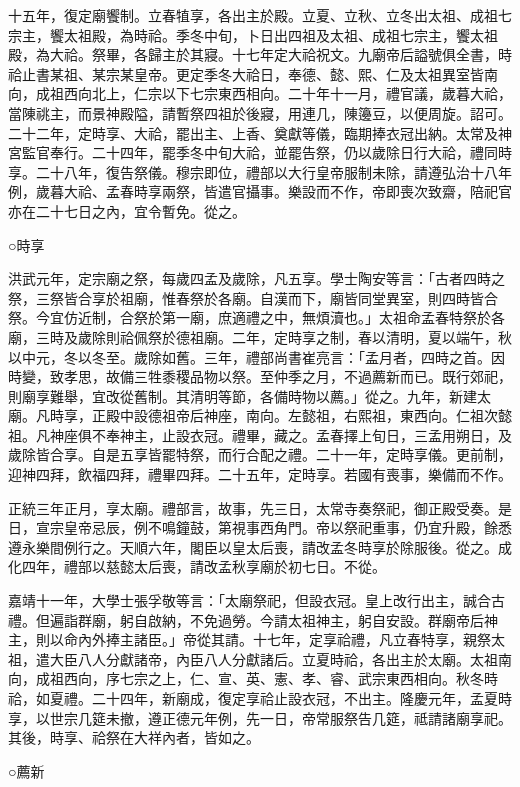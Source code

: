 十五年，復定廟饗制。立春犆享，各出主於殿。立夏、立秋、立冬出太祖、成祖七宗主，饗太祖殿，為時祫。季冬中旬，卜日出四祖及太祖、成祖七宗主，饗太祖殿，為大祫。祭畢，各歸主於其寢。十七年定大祫祝文。九廟帝后謚號俱全書，時祫止書某祖、某宗某皇帝。更定季冬大祫日，奉德、懿、熙、仁及太祖異室皆南向，成祖西向北上，仁宗以下七宗東西相向。二十年十一月，禮官議，歲暮大祫，當陳祧主，而景神殿隘，請暫祭四祖於後寢，用連几，陳籩豆，以便周旋。詔可。二十二年，定時享、大祫，罷出主、上香、奠獻等儀，臨期捧衣冠出納。太常及神宮監官奉行。二十四年，罷季冬中旬大祫，並罷告祭，仍以歲除日行大祫，禮同時享。二十八年，復告祭儀。穆宗即位，禮部以大行皇帝服制未除，請遵弘治十八年例，歲暮大祫、孟春時享兩祭，皆遣官攝事。樂設而不作，帝即喪次致齋，陪祀官亦在二十七日之內，宜令暫免。從之。

○時享

洪武元年，定宗廟之祭，每歲四孟及歲除，凡五享。學士陶安等言：「古者四時之祭，三祭皆合享於祖廟，惟春祭於各廟。自漢而下，廟皆同堂異室，則四時皆合祭。今宜仿近制，合祭於第一廟，庶適禮之中，無煩瀆也。」太祖命孟春特祭於各廟，三時及歲除則祫佩祭於德祖廟。二年，定時享之制，春以清明，夏以端午，秋以中元，冬以冬至。歲除如舊。三年，禮部尚書崔亮言：「孟月者，四時之首。因時變，致孝思，故備三牲黍稷品物以祭。至仲季之月，不過薦新而已。既行郊祀，則廟享難舉，宜改從舊制。其清明等節，各備時物以薦。」從之。九年，新建太廟。凡時享，正殿中設德祖帝后神座，南向。左懿祖，右熙祖，東西向。仁祖次懿祖。凡神座俱不奉神主，止設衣冠。禮畢，藏之。孟春擇上旬日，三孟用朔日，及歲除皆合享。自是五享皆罷特祭，而行合配之禮。二十一年，定時享儀。更前制，迎神四拜，飲福四拜，禮畢四拜。二十五年，定時享。若國有喪事，樂備而不作。

正統三年正月，享太廟。禮部言，故事，先三日，太常寺奏祭祀，御正殿受奏。是日，宣宗皇帝忌辰，例不鳴鐘鼓，第視事西角門。帝以祭祀重事，仍宜升殿，餘悉遵永樂間例行之。天順六年，閣臣以皇太后喪，請改孟冬時享於除服後。從之。成化四年，禮部以慈懿太后喪，請改孟秋享廟於初七日。不從。

嘉靖十一年，大學士張孚敬等言：「太廟祭祀，但設衣冠。皇上改行出主，誠合古禮。但遍詣群廟，躬自啟納，不免過勞。今請太祖神主，躬自安設。群廟帝后神主，則以命內外捧主諸臣。」帝從其請。十七年，定享祫禮，凡立春特享，親祭太祖，遣大臣八人分獻諸帝，內臣八人分獻諸后。立夏時祫，各出主於太廟。太祖南向，成祖西向，序七宗之上，仁、宣、英、憲、孝、睿、武宗東西相向。秋冬時祫，如夏禮。二十四年，新廟成，復定享祫止設衣冠，不出主。隆慶元年，孟夏時享，以世宗几筵未撤，遵正德元年例，先一日，帝常服祭告几筵，祗請諸廟享祀。其後，時享、祫祭在大祥內者，皆如之。

○薦新

